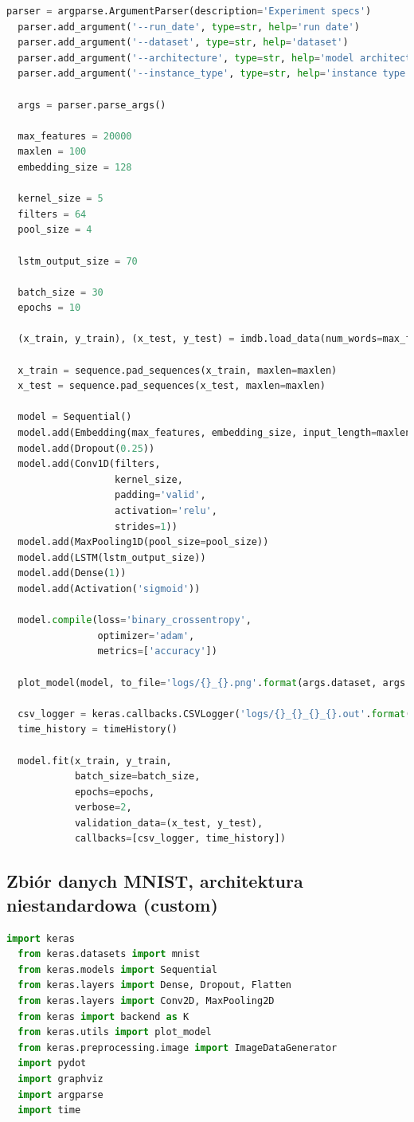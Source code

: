 \documentclass[12pt,a4paper,twoside]{article}
\begin{document}
\begin{appendices}
\begin{lstlisting}[language=python]
  parser = argparse.ArgumentParser(description='Experiment specs')
  parser.add_argument('--run_date', type=str, help='run date')
  parser.add_argument('--dataset', type=str, help='dataset')
  parser.add_argument('--architecture', type=str, help='model architecture')
  parser.add_argument('--instance_type', type=str, help='instance type')

  args = parser.parse_args()

  max_features = 20000
  maxlen = 100
  embedding_size = 128

  kernel_size = 5
  filters = 64
  pool_size = 4

  lstm_output_size = 70

  batch_size = 30
  epochs = 10

  (x_train, y_train), (x_test, y_test) = imdb.load_data(num_words=max_features)

  x_train = sequence.pad_sequences(x_train, maxlen=maxlen)
  x_test = sequence.pad_sequences(x_test, maxlen=maxlen)

  model = Sequential()
  model.add(Embedding(max_features, embedding_size, input_length=maxlen))
  model.add(Dropout(0.25))
  model.add(Conv1D(filters,
                   kernel_size,
                   padding='valid',
                   activation='relu',
                   strides=1))
  model.add(MaxPooling1D(pool_size=pool_size))
  model.add(LSTM(lstm_output_size))
  model.add(Dense(1))
  model.add(Activation('sigmoid'))

  model.compile(loss='binary_crossentropy',
                optimizer='adam',
                metrics=['accuracy'])

  plot_model(model, to_file='logs/{}_{}.png'.format(args.dataset, args.architecture))

  csv_logger = keras.callbacks.CSVLogger('logs/{}_{}_{}_{}.out'.format(args.run_date, args.dataset, args.architecture, args.instance_type))
  time_history = timeHistory()

  model.fit(x_train, y_train,
            batch_size=batch_size,
            epochs=epochs,
            verbose=2,
            validation_data=(x_test, y_test),
            callbacks=[csv_logger, time_history])
\end{lstlisting}
\clearpage
\subsection{Zbiór danych MNIST, architektura niestandardowa (custom)}
\begin{lstlisting}[language=python]
  import keras
  from keras.datasets import mnist
  from keras.models import Sequential
  from keras.layers import Dense, Dropout, Flatten
  from keras.layers import Conv2D, MaxPooling2D
  from keras import backend as K
  from keras.utils import plot_model
  from keras.preprocessing.image import ImageDataGenerator
  import pydot
  import graphviz
  import argparse
  import time


\end{lstlisting}
\end{appendices}
\end{document}
